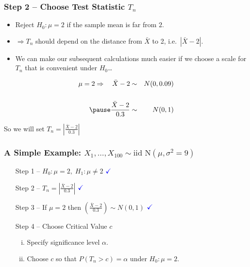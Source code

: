 \begin{frame}
  \frametitle{Step 2 -- Choose Test Statistic $T_n$}
  \begin{itemize}
    \item Reject $H_0\colon \mu = 2$ if the sample mean is far from $2$. \pause
    \item $\Rightarrow T_n$ should depend on the \alert{distance} from $\bar{X}$ to 2, i.e.\ $|\bar{X} - 2|$.\pause
    \item We can make our subsequent calculations much easier if we choose a \alert{scale for $T_n$ that is convenient under $H_0$\dots}
  \end{itemize}
  \begin{eqnarray*}
    \mu=2 \Rightarrow \quad \bar{X} - 2 &\sim& N(0, 0.09) \\ \\ \pause
    \frac{\bar{X} - 2}{0.3} &\sim& N(0,1)
  \end{eqnarray*}

  \alert{So we will set $\displaystyle T_n = \left|\frac{\bar{X} - 2}{0.3}\right|$}

\end{frame}
\begin{frame}
  \frametitle{A Simple Example: $X_1, \dots, X_{100}\sim \mbox{iid N}(\mu, \sigma^2 = 9)$}
  \begin{enumerate}
    \item[Step 1] -- $H_0\colon \mu = 2, \; H_1\colon \mu \neq 2$ $\textcolor{blue}{\checkmark}$
    \item[Step 2] -- $T_n = \displaystyle \left|\frac{\bar{X} - 2}{0.3} \right|$ $\textcolor{blue}{\checkmark}$
    \item[Step 3] -- If $\mu = 2$ then $\displaystyle \left(\frac{\bar{X} - 2}{0.3}\right) \sim N(0,1)$ $\textcolor{blue}{\checkmark}$
    \item[Step 4] -- \alert{Choose Critical Value $c$}
      \begin{enumerate}[(i)]
        \item Specify significance level $\alpha$.
        \item Choose $c$ so that $P(T_n > c)=\alpha$ under $H_0\colon \mu = 2$.
      \end{enumerate}
  \end{enumerate}
\end{frame}

